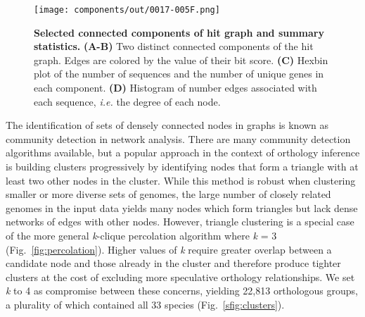 \documentclass[10pt,letterpaper]{article}
\begin{document}
\begin{figure}[h!]
\texttt{[image: components/out/0017-005F.png]}
\centering
\caption{\textbf{Selected connected components of hit graph and summary statistics.}
\textbf{(A-B)} Two distinct connected components of the hit graph. Edges are colored by the value of their bit score. \textbf{(C)} Hexbin plot of the number of sequences and the number of unique genes in each component. \textbf{(D)} Histogram of number edges associated with each sequence, \textit{i.e.} the degree of each node.}
\label{fig:components}
\end{figure}

The identification of sets of densely connected nodes in graphs is known as community detection in network analysis. There are many community detection algorithms available, but a popular approach in the context of orthology inference is building clusters progressively by identifying nodes that form a triangle with at least two other nodes in the cluster. While this method is robust when clustering smaller or more diverse sets of genomes, the large number of closely related genomes in the input data yields many nodes which form triangles but lack dense networks of edges with other nodes. However, triangle clustering is a special case of the more general \textit{k}-clique percolation algorithm where \textit{k} = 3 (Fig.~\ref{fig:percolation}). Higher values of \textit{k} require greater overlap between a candidate node and those already in the cluster and therefore produce tighter clusters at the cost of excluding more speculative orthology relationships. We set \textit{k} to 4 as compromise between these concerns, yielding 22,813 orthologous groups, a plurality of which contained all 33 species (Fig.~\ref{sfig:clusters}).
\end{document}

